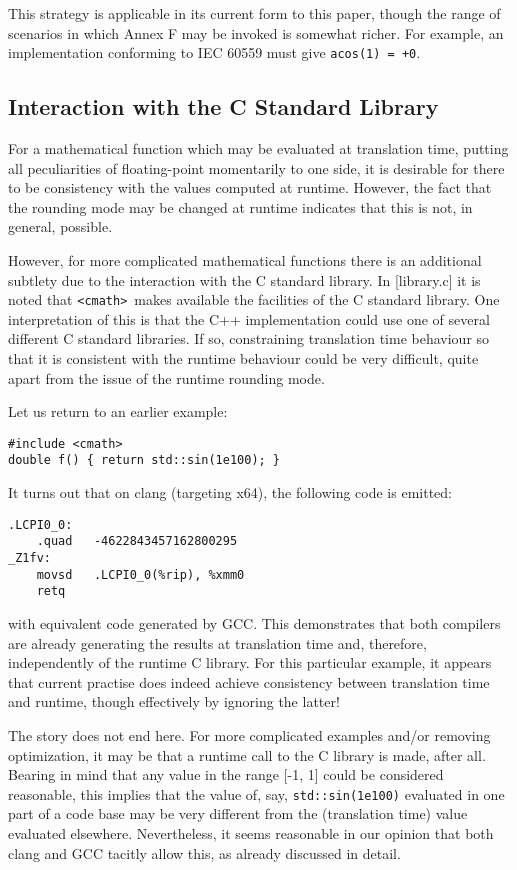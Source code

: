 \documentclass[prd,twocolumn,amsmath,amssymb,nofootinbib,eqsecnum]{revtex4-1}
\newcommand{\code}[1]{{\tt #1}}
\newcommand{\header}[1]{{\tt <#1>}}
\newcommand{\cmath}{\header{cmath}}
\begin{document}
This strategy is applicable in its current form to this paper, though the range of scenarios
in which Annex F may be invoked is somewhat richer. For example, an implementation
conforming to IEC 60559 must give \code{acos(1) = +0}.

\subsection{Interaction with the C Standard Library}

For a mathematical function which may be evaluated at translation time, 
putting all peculiarities of floating-point momentarily to one side, it is desirable for there to be
consistency with the values computed at runtime. However, the fact that the rounding mode
may be changed at runtime indicates that this is not, in general, possible. 

However, for more complicated mathematical functions there is an additional subtlety due
to the interaction with the C standard library. In [library.c] it is noted that \cmath\ makes available the facilities of the C standard library. One interpretation of this is that the C++
implementation could use one of several different C standard libraries. If so, 
constraining translation time behaviour so that it is consistent with the runtime behaviour
could be very difficult, quite apart from the issue of the runtime rounding mode.

Let us return to an earlier example:
\begin{Verbatim}
#include <cmath>
double f() { return std::sin(1e100); }
\end{Verbatim}
It turns out that on clang (targeting x64), the following code is emitted:
\begin{Verbatim}
.LCPI0_0:
	.quad	-4622843457162800295 
_Z1fv:
	movsd	.LCPI0_0(%rip), %xmm0
	retq
\end{Verbatim}
with equivalent code generated by GCC. This demonstrates that both compilers are already generating the results at translation time and, therefore, independently of the runtime C library. For this particular example, it appears that current practise does indeed achieve consistency between translation time and runtime, though effectively by ignoring the latter!

The story does not end here. For more complicated examples and/or removing optimization, it may be that a runtime call to the C library is made, after all. Bearing in mind that any value in the range [-1, 1] could be considered reasonable, this implies that the value of, say, \code{std::sin(1e100)} evaluated in one part of a code base may be very different from the (translation time) value evaluated elsewhere. 
Nevertheless, it seems reasonable in our opinion that both clang and GCC tacitly allow this, as already discussed in detail.
\end{document}

